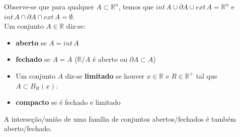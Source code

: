 \documentclass{article}
\newcommand{\R}{\mathbb{R}}
\begin{document}
Observe-se que para qualquer $A \subset \R^n$, temos que 
$int \, A \cup \partial A \cup ext \, A = \R^n$ e $int \, A \cap \partial A \cap ext \, A = \emptyset$.\\
Um conjunto $A \in \R$ diz-se: \vspace{-0.8mm}
\begin{itemize}
\item \textbf{aberto} se $A= int \, A$ \vspace{-1mm}
\item \textbf{fechado} se $A= \overline{A}$ ($\R/A$ é aberto ou $\partial A \subset A$) \vspace{-0.8mm}
\item Um conjunto $A$ diz-se \textbf{limitado} se houver $x \in \R$ e $R \in \R^+$ tal que $A \subset B_R(x)$.
\item \textbf{compacto} se é fechado e limitado \vspace{-0.8mm}
\end{itemize}
A interseção/união de uma família de conjuntos abertos/fechados é também aberto/fechado.
\end{document}
